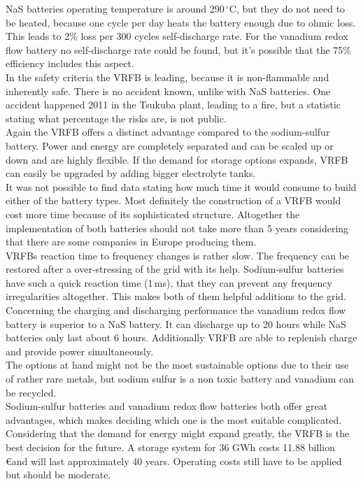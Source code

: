 \begin{parcolumns}[colwidths={1=2.5 cm, 2=10 cm, 3=2.5cm}]{3}
{NaS batteries operating temperature is around 290\,$^\circ$C, but they do not need to be heated, because one cycle per day heats the battery enough due to ohmic loss. This leads to 2$\%$ loss per 300 cycles self-discharge rate. For the vanadium redox flow battery no self-discharge rate could be found, but it's possible that the 75$\%$ efficiency includes this aspect.\\
In the safety criteria the VRFB is leading, because it is non-flammable and inherently safe. There is no accident known, unlike with NaS batteries. One accident happened 2011 in the Tsukuba plant, leading to a fire, but a statistic stating what percentage the risks are, is not public. \\
Again the VRFB offers a distinct advantage compared to the sodium-sulfur battery. Power and energy are completely separated and can be scaled up or down and are highly flexible. If the demand for storage options expands, VRFB can easily be upgraded by adding bigger electrolyte tanks.\\
It was not possible to find data stating how much time it would consume to build either of the battery types. Most definitely the construction of a VRFB would cost more time because of its sophisticated structure. Altogether the implementation of both batteries should not take more than 5 years considering that there are some companies in Europe producing them.\\
VRFBs reaction time to frequency changes is rather slow. The frequency can be restored after a over-stressing of the grid with its help. Sodium-sulfur batteries have such a quick reaction time (1\,ms), that they can prevent any frequency irregularities altogether. This makes both of them helpful additions to the grid. Concerning the charging and discharging performance the vanadium redox flow battery is superior to a NaS battery. It can discharge up to 20 hours while NaS batteries only last about 6 hours. Additionally VRFB are able to replenish charge and provide power simultaneously.\\ 
The options at hand might not be the most sustainable options due to their use of rather rare metals, but sodium sulfur is a non toxic battery and vanadium can be recycled.\\
Sodium-sulfur batteries and vanadium redox flow batteries both offer great advantages, which makes deciding which one is the most suitable complicated. Considering that the demand for energy might expand greatly, the VRFB is the best decision for the future. A storage system for 36 GWh costs 11.88 billion \euro and will last approximately  40 years. Operating costs still have to be applied but should be moderate.\\
}
\end{parcolumns}
